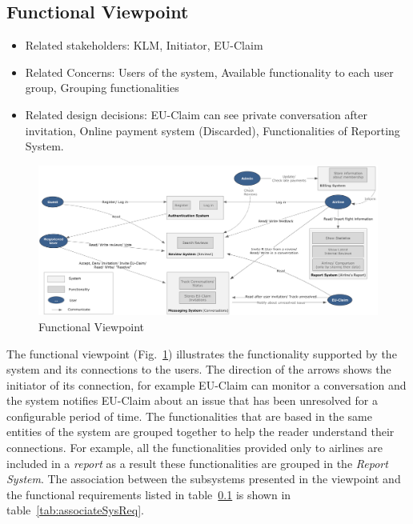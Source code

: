 % 

\subsection{Functional Viewpoint}

\begin{itemize}
\item Related stakeholders: KLM, Initiator, EU-Claim
\item Related Concerns: Users of the system, Available functionality to each user group, Grouping functionalities
\item Related design decisions: EU-Claim can see private conversation after invitation, Online payment system (Discarded), Functionalities of Reporting System.
\end{itemize}

\newpage
\begin{landscape}
\begin{figure}
\includegraphics[width=600px]{Functional_Viewpoint.jpg}
\caption{Functional Viewpoint}
\label{fig:functional}
\end{figure}
\end{landscape}

The functional viewpoint (Fig.~\ref{fig:functional}) illustrates the functionality supported by the system and its connections to the users. The direction of the arrows shows the initiator of its connection, for example EU-Claim can monitor a conversation and the system notifies EU-Claim about an issue that has been unresolved for a configurable period of time. The functionalities that are based in the same entities of the system are grouped together to help the reader understand their connections. For example, all the functionalities 
 provided only to airlines are included in a {\em report} as a result these functionalities are grouped in the {\em Report System}. The association between the subsystems presented in the viewpoint and the functional requirements listed in table~\ref{} is shown in table~\ref{tab:associateSysReq}.

